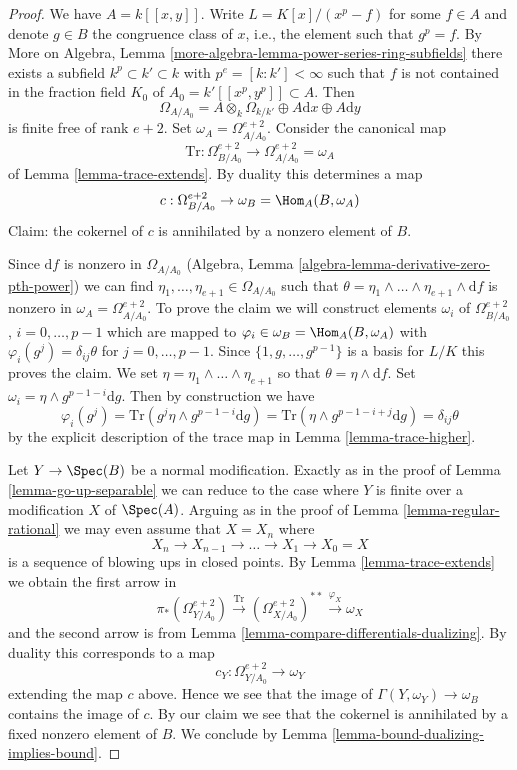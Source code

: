\begin{proof}
We have $A = k[[x, y]]$. Write $L = K[x]/(x^p - f)$ for some $f \in A$
and denote $g \in B$ the congruence class of $x$, i.e., the element such
that $g^p = f$. By
More on Algebra, Lemma \ref{more-algebra-lemma-power-series-ring-subfields}
there exists a subfield $k^p \subset k' \subset k$ with
$p^e = [k : k'] < \infty$
such that $f$ is not contained in the fraction field $K_0$ of
$A_0 = k'[[x^p, y^p]] \subset A$. Then
$$
\Omega_{A/A_0} =
A \otimes_k \Omega_{k/k'} \oplus A \text{d}x \oplus A \text{d}y
$$
is finite free of rank $e + 2$. Set $\omega_A = \Omega^{e + 2}_{A/A_0}$.
Consider the canonical map
$$
\text{Tr} :
\Omega^{e + 2}_{B/A_0}
\longrightarrow
\Omega^{e + 2}_{A/A_0} = \omega_A
$$
of Lemma \ref{lemma-trace-extends}. By duality this determines a map
$$
c : \Omega^{e + 2}_{B/A_0} \to \omega_B = \Hom_A(B, \omega_A)
$$
Claim: the cokernel of $c$ is annihilated by a nonzero element of $B$.

\medskip\noindent
Since $\text{d}f$ is nonzero in $\Omega_{A/A_0}$
(Algebra, Lemma \ref{algebra-lemma-derivative-zero-pth-power}) we can find
$\eta_1, \ldots, \eta_{e + 1} \in \Omega_{A/A_0}$ such that
$\theta = \eta_1 \wedge \ldots \wedge \eta_{e + 1} \wedge \text{d}f$ is
nonzero in $\omega_A = \Omega^{e + 2}_{A/A_0}$. To prove the claim we
will construct elements $\omega_i$ of $\Omega^{e + 2}_{B/A_0}$,
$i = 0, \ldots, p - 1$ which are mapped to
$\varphi_i \in \omega_B = \Hom_A(B, \omega_A)$
with $\varphi_i(g^j) = \delta_{ij}\theta$ for $j = 0, \ldots, p - 1$.
Since $\{1, g, \ldots, g^{p - 1}\}$ is a basis for $L/K$ this
proves the claim. We set
$\eta = \eta_1 \wedge \ldots \wedge \eta_{e + 1}$
so that $\theta = \eta \wedge \text{d}f$.
Set $\omega_i = \eta \wedge g^{p - 1 - i}\text{d}g$. Then
by construction we have
$$
\varphi_i(g^j) = \text{Tr}(g^j \eta \wedge g^{p - 1 - i}\text{d}g) =
\text{Tr}(\eta \wedge g^{p - 1 - i + j}\text{d}g) = \delta_{ij} \theta
$$
by the explicit description of the trace map in Lemma \ref{lemma-trace-higher}.

\medskip\noindent
Let $Y \to \Spec(B)$ be a normal modification. Exactly as in the proof of
Lemma \ref{lemma-go-up-separable} we can reduce to the case where $Y$
is finite over a modification $X$ of $\Spec(A)$. Arguing as in the proof
of Lemma \ref{lemma-regular-rational} we may even assume that $X = X_n$ where
$$
X_n \to X_{n - 1} \to \ldots \to X_1 \to X_0 = X
$$
is a sequence of blowing ups in closed points. By
Lemma \ref{lemma-trace-extends} we obtain the first arrow in
$$
\pi_*(\Omega^{e + 2}_{Y/A_0})
\xrightarrow{\text{Tr}}
(\Omega^{e + 2}_{X/A_0})^{**}
\xrightarrow{\varphi_X}
\omega_X
$$
and the second arrow is from
Lemma \ref{lemma-compare-differentials-dualizing}.
By duality this corresponds to a map
$$
c_Y : \Omega^{e + 2}_{Y/A_0} \longrightarrow \omega_Y
$$
extending the map $c$ above. Hence we see that the image of
$\Gamma(Y, \omega_Y) \to \omega_B$ contains the image of $c$.
By our claim we see that the cokernel is annihilated by
a fixed nonzero element of $B$. We conclude by
Lemma \ref{lemma-bound-dualizing-implies-bound}.
\end{proof}






